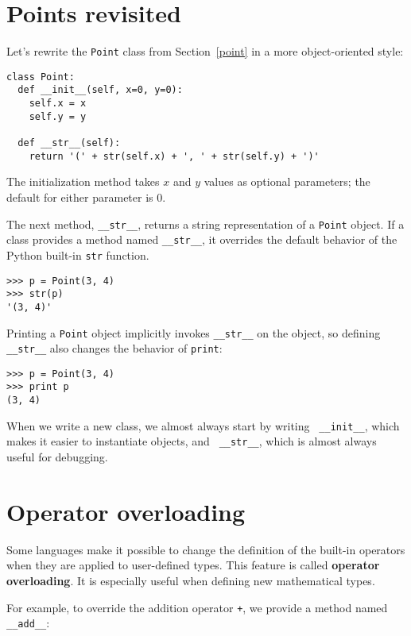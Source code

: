 \section{Points revisited}

Let's rewrite the {\tt Point} class from
Section~\ref{point} in a more object-oriented style:

\beforeverb
\begin{verbatim}
class Point:
  def __init__(self, x=0, y=0):
    self.x = x
    self.y = y

  def __str__(self):
    return '(' + str(self.x) + ', ' + str(self.y) + ')'
\end{verbatim}
\afterverb
%
The initialization method
takes $x$ and $y$ values as optional parameters;
the default for either parameter is 0.

The next method, {\tt \_\_str\_\_}, returns a string representation
of a {\tt Point} object.
If a class provides a method named {\tt \_\_str\_\_}, it
overrides the default behavior of the Python built-in {\tt str} function.

\beforeverb
\begin{verbatim}
>>> p = Point(3, 4)
>>> str(p)
'(3, 4)'
\end{verbatim}
\afterverb
%
Printing a {\tt Point} object implicitly invokes {\tt \_\_str\_\_} on
the object, so defining {\tt \_\_str\_\_} also changes the behavior of
{\tt print}:

\beforeverb
\begin{verbatim}
>>> p = Point(3, 4)
>>> print p
(3, 4)
\end{verbatim}
\afterverb
%
When we write a new class, we almost always start by writing {\tt
\_\_init\_\_}, which makes it easier to instantiate objects, and {\tt
\_\_str\_\_}, which is almost always useful for debugging.


\section{Operator overloading}
\label{operator overloading}

Some languages make it possible to change the definition of the
built-in operators when they are applied to user-defined types.  This
feature is called {\bf operator overloading}.  It is especially useful when
defining new mathematical types.

For example, to override the addition operator {\tt +}, we
provide a method named {\tt \_\_add\_\_}:

